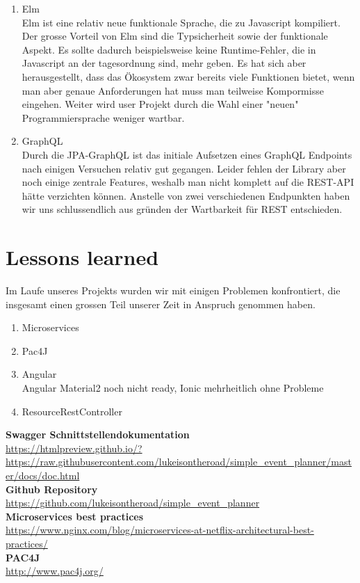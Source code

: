 \documentclass[11pt]{article} %
\begin{document}
\begin{enumerate}
\item Elm\\
Elm ist eine relativ neue funktionale Sprache, die zu Javascript kompiliert. Der grosse Vorteil von Elm sind die Typsicherheit sowie der funktionale Aspekt. Es sollte dadurch beispielsweise keine Runtime-Fehler, die in Javascript an der tagesordnung sind, mehr geben.
Es hat sich aber herausgestellt, dass das Ökosystem zwar bereits viele Funktionen bietet, wenn man aber genaue Anforderungen hat muss man teilweise Kompormisse eingehen.
Weiter wird user Projekt durch die Wahl einer "neuen" Programmiersprache weniger wartbar.
\item GraphQL\\
Durch die JPA-GraphQL ist das initiale Aufsetzen eines GraphQL Endpoints nach einigen Versuchen relativ gut gegangen. Leider fehlen der Library aber noch einige zentrale Features, weshalb man nicht komplett auf die REST-API hätte verzichten können. Anstelle von zwei verschiedenen Endpunkten haben wir uns schlussendlich aus gründen der Wartbarkeit für REST entschieden.
\end{enumerate}

\newpage
\section{Lessons learned}
Im Laufe unseres Projekts wurden wir mit einigen Problemen konfrontiert, die insgesamt einen grossen Teil unserer Zeit in Anspruch genommen haben.

\begin{enumerate}
\item Microservices\\
\item Pac4J\\
\item Angular\\
Angular Material2 noch nicht ready, Ionic mehrheitlich ohne Probleme
\item ResourceRestController
\end{enumerate}

\newpage
\begin{appendices}

\textbf{Swagger Schnittstellendokumentation}\\
\url{https://htmlpreview.github.io/?https://raw.githubusercontent.com/lukeisontheroad/simple_event_planner/master/docs/doc.html}\\

\textbf{Github Repository}\\
\url{https://github.com/lukeisontheroad/simple_event_planner}\\

\textbf{Microservices best practices}\\
\url{https://www.nginx.com/blog/microservices-at-netflix-architectural-best-practices/}\\

\textbf{PAC4J}\\
\url{http://www.pac4j.org/}\\



\newpage

\end{appendices}
\end{document}
